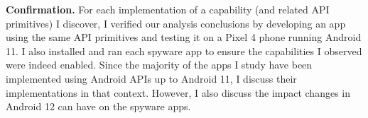 \textbf{Confirmation.} For each implementation of a capability (and
related API primitives) I discover, I verified our analysis conclusions
by developing an app using the same API primitives and
testing it on a Pixel 4 phone running Android 11. I also installed and ran each spyware app to ensure the capabilities I observed were indeed enabled.
Since the majority of the apps I
study have been implemented using Android APIs up to Android 11, I
discuss their implementations in that context. However, I also
discuss the impact changes in Android 12 can have on the spyware apps.







